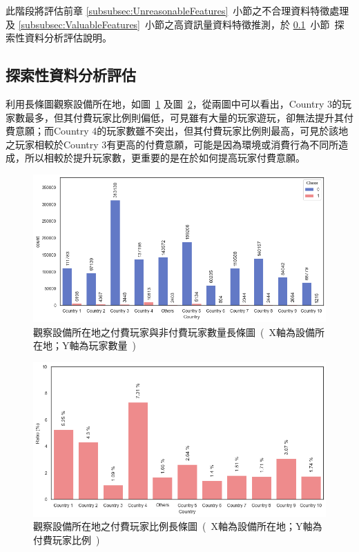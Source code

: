 此階段將評估前章 \ref{subsubsec:UnreasonableFeatures}~小節之不合理資料特徵處理及 \ref{subsubsec:ValuableFeatures}~小節之高資訊量資料特徵推測，於 \ref{subsec:EDAEvaluation}~小節\ 探索性資料分析評估說明。

\subsection{探索性資料分析評估}
\label{subsec:EDAEvaluation}

利用長條圖觀察設備所在地，如圖~\ref{fig:eva_CountryBarPlot} 及圖~\ref{fig:eva_CountryPayerRatioBarPlot}，從兩圖中可以看出，Country 3的玩家數最多，但其付費玩家比例則偏低，可見雖有大量的玩家遊玩，卻無法提升其付費意願；而Country 4的玩家數雖不突出，但其付費玩家比例則最高，可見於該地之玩家相較於Country 3有更高的付費意願，可能是因為環境或消費行為不同所造成，所以相較於提升玩家數，更重要的是在於如何提高玩家付費意願。

\begin{figure}[!htb]
    \begin{center}
      \includegraphics[width=1\textwidth]{figures/evaluation/Image_CountryBarPlot.png}
      \caption[觀察設備所在地之付費玩家與非付費玩家數量長條圖]{觀察設備所在地之付費玩家與非付費玩家數量長條圖\ (\ X軸為設備所在地；Y軸為玩家數量\ )\ }
      \label{fig:eva_CountryBarPlot}
    \end{center}
\end{figure}
\newpage

\begin{figure}[!htb]
    \begin{center}
      \includegraphics[width=1\textwidth]{figures/evaluation/Image_CountryPayerRatioBarPlot.png}
      \caption[觀察設備所在地之付費玩家比例長條圖]{觀察設備所在地之付費玩家比例長條圖\ (\ X軸為設備所在地；Y軸為付費玩家比例\ )\ }
      \label{fig:eva_CountryPayerRatioBarPlot}
    \end{center}
\end{figure}

